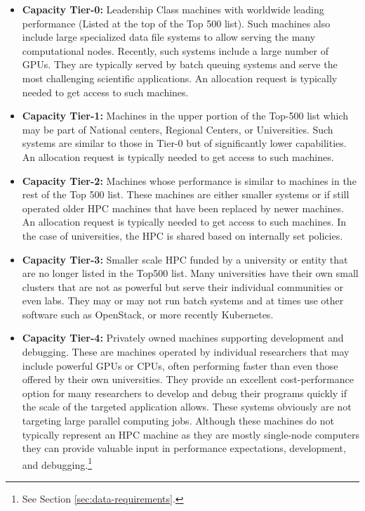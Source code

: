 \documentclass[utf8]{FrontiersinVancouver} %
\begin{document}
\begin{itemize}
\item {\bf Capacity Tier-0:} Leadership Class machines with worldwide leading
  performance (Listed at the top of the Top 500 list). Such machines also include large specialized data file systems to allow serving the many computational nodes. Recently, such systems include a large number of GPUs. They are typically served by batch queuing systems and serve the most challenging scientific applications. An allocation request is typically needed to get access to such machines.
\item {\bf Capacity Tier-1:} Machines in the upper portion of the Top-500 list which may be part of National centers, Regional Centers, or Universities. Such systems are similar to those in Tier-0 but of significantly lower capabilities.
An allocation request is typically needed to get access to such machines.
\item {\bf Capacity Tier-2:} Machines whose performance is similar to machines
  in the rest of the Top 500 list. These machines are either smaller systems or if still operated older HPC machines that have been replaced by newer machines.
  An allocation request is typically needed to get access to such machines. In the case of universities, the HPC is shared based on internally set policies.
\item {\bf Capacity Tier-3:} Smaller scale HPC funded by a university or entity
  that are no longer listed in the Top500 list. Many universities have their own small clusters that are not as powerful but serve their individual communities or even labs. They may or may not run batch systems and at times use other software such as OpenStack, or more recently Kubernetes. 
\item {\bf Capacity Tier-4:} Privately owned machines supporting development
  and debugging. These are machines operated by individual researchers that may include powerful GPUs or CPUs, often performing faster than even those offered by their own universities. They provide an excellent cost-performance option for many researchers to develop and debug their programs quickly if the scale of the targeted application allows. These systems obviously are not targeting large parallel computing jobs. Although these machines do not typically represent an HPC machine as they are mostly single-node computers they can provide valuable input in performance expectations, development, and debugging.\footnote{See Section \ref{sec:data-requirements}.}
\end{itemize}
\end{document}
